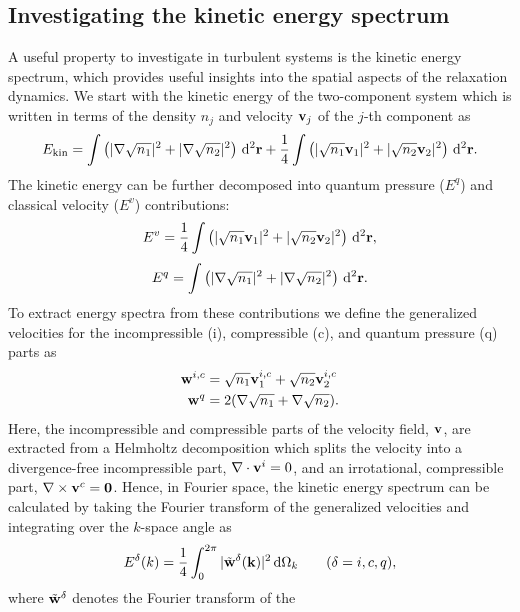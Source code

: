 \subsection{Investigating the kinetic energy spectrum}
A useful property to investigate in turbulent systems is the kinetic energy
spectrum, which provides useful insights into the spatial aspects of the
relaxation dynamics.
We start with the kinetic energy of the two-component system which is written
in terms of the density \(n_j\) and velocity \(\vb{v}_j\) of the \(j\)-th
component as
\begin{align}
    E_\mathrm{kin} = \int \left(|\nabla\sqrt{n_1}|^2
    + |\nabla\sqrt{n_2}|^2\right) \, \dd^2\vb{r} 
    + \frac{1}{4}\int \left(|\sqrt{n_1}\vb{v}_1|^2
    + |\sqrt{n_2}\vb{v}_2|^2\right) \, \dd^2\vb{r}.
\end{align}
The kinetic energy can be further decomposed into quantum pressure
(\( E^q\)) and classical velocity (\(E^v\)) contributions:
\begin{align}
    E^v = \frac{1}{4}\int \left(|\sqrt{n_1}\vb{v}_1|^2
    + |\sqrt{n_2}\vb{v}_2|^2\right) \, \dd^2\vb{r},
\end{align}
\begin{align}
    E^q = \int \left(|\nabla\sqrt{n_1}|^2
    + |\nabla\sqrt{n_2}|^2\right) \, \dd^2\vb{r}.
\end{align}
To extract energy spectra from these contributions we define the generalized
velocities for the incompressible (i), compressible (c), and quantum pressure
(q) parts as~\cite{Schmied2019}
\begin{align}
    \vb{w}^{i, c} &= \sqrt{n_1}\vb{v}_1^{i, c} + \sqrt{n_2}\vb{v}_2^{i, c} \\
    \vb{w}^q      &= 2 (\nabla \sqrt{n_1} + \nabla \sqrt{n_2}).
\end{align}
Here, the incompressible and compressible parts of the velocity field,
\(\vb{v}\), are extracted from a Helmholtz decomposition which splits the
velocity into a divergence-free incompressible part,
\(\nabla \cdot \vb{v}^i = 0\), and an irrotational, compressible part,
\(\nabla \times \vb{v}^c=\vb{0}\).
Hence, in Fourier space, the kinetic energy spectrum can be calculated by
taking the Fourier transform of the generalized velocities and integrating over
the \(k\)-space angle as
\begin{align}
    E^\delta(k) = \frac{1}{4} \int_{0}^{2\pi}
    |\tilde{\vb{w}}^\delta(\vb{k})|^2 \, \dd\Omega_k
    \qquad (\delta = i, c, q),
\end{align}
where \(\tilde{\vb{w}}^\delta \) denotes the Fourier transform of the
